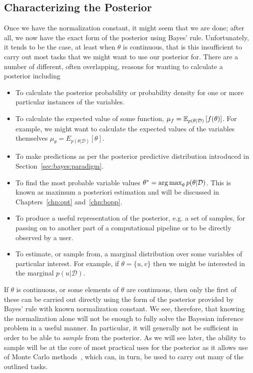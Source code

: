\subsection{Characterizing the Posterior}
\label{sec:inf:challenge:post}

Once we have the normalization constant, it might seem that we are done; after all,
we now have the exact form of the posterior using Bayes' rule.  Unfortunately, it tends to
be the case, at least when $\theta$ is continuous, that is this insufficient to carry out most
tasks that we might want to use our posterior for.  There are a number of different, often
overlapping, reasons for wanting to calculate a posterior including
\begin{itemize}
		\setlength\itemsep{0em}
	\item To calculate the posterior probability or probability density for one or more particular
	instances of the variables.
	\item To calculate the expected value of some function, $\mu_f = \mathbb{E}_{p(\theta|\mathcal{D})}\left[f(\theta)\right]$.
	For example, we might want to calculate the expected values of the variables themselves
	$\mu_\theta = E_{p(\theta|\mathcal{D})} \left[\theta\right]$.
	\item To make predictions as per the posterior predictive distribution introduced in Section~\ref{sec:bayes:paradigm}.
	\item To find the most probable variable values $\theta^* = \operatorname*{arg\,max}_{\theta} p(\theta|\mathcal{D})$.  
	This is known
	as maximum a posteriori estimation and will be discussed in Chapters~\ref{chp:opt} and~\ref{chp:bopp}.
	\item To produce a useful representation of the posterior, e.g. a set of samples,
	for passing on to another part of a computational pipeline or to be directly observed by a user.
	\item To estimate, or sample from, a marginal distribution over some variables of particular
	interest.  For example, if $\theta=\{u,v\}$ then we might be interested in the marginal
	$p(u|\mathcal{D})$.
\end{itemize}
If $\theta$ is continuous, or some elements of $\theta$ are continuous, then only the first of
these can be carried out directly using the form of the posterior provided by Bayes' rule
with known normalization constant.  We see, therefore, that knowing the normalization alone
will not be enough to fully solve the Bayesian inference problem in a useful manner.  In
particular, it will generally not be sufficient in order to be able to \emph{sample} from the
posterior.  As we will see later, the ability to sample will be at the core of most practical uses
for the posterior as it allows use of Monte Carlo
 methods~\citep{metropolis1949monte,robert2004monte,rubinstein2016simulation}, which
 can, in turn, be used to carry out many of the outlined tasks.

